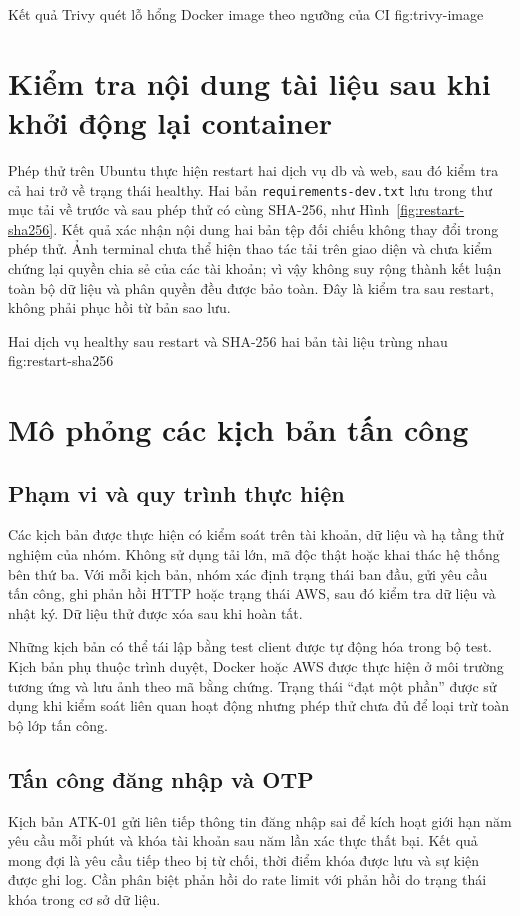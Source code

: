 {Kết quả Trivy quét lỗ hổng Docker image theo ngưỡng của CI}
{fig:trivy-image}

\section{Kiểm tra nội dung tài liệu sau khi khởi động lại container}
Phép thử trên Ubuntu thực hiện restart hai dịch vụ db và web, sau đó kiểm tra cả hai trở về trạng thái healthy. Hai bản \texttt{requirements-dev.txt} lưu trong thư mục tải về trước và sau phép thử có cùng SHA-256, như Hình~\ref{fig:restart-sha256}. Kết quả xác nhận nội dung hai bản tệp đối chiếu không thay đổi trong phép thử. Ảnh terminal chưa thể hiện thao tác tải trên giao diện và chưa kiểm chứng lại quyền chia sẻ của các tài khoản; vì vậy không suy rộng thành kết luận toàn bộ dữ liệu và phân quyền đều được bảo toàn. Đây là kiểm tra sau restart, không phải phục hồi từ bản sao lưu.

{Hai dịch vụ healthy sau restart và SHA-256 hai bản tài liệu trùng nhau}
{fig:restart-sha256}

\section{Mô phỏng các kịch bản tấn công}
\subsection{Phạm vi và quy trình thực hiện}
Các kịch bản được thực hiện có kiểm soát trên tài khoản, dữ liệu và hạ tầng thử nghiệm của nhóm. Không sử dụng tải lớn, mã độc thật hoặc khai thác hệ thống bên thứ ba. Với mỗi kịch bản, nhóm xác định trạng thái ban đầu, gửi yêu cầu tấn công, ghi phản hồi HTTP hoặc trạng thái AWS, sau đó kiểm tra dữ liệu và nhật ký. Dữ liệu thử được xóa sau khi hoàn tất.

Những kịch bản có thể tái lập bằng test client được tự động hóa trong bộ test. Kịch bản phụ thuộc trình duyệt, Docker hoặc AWS được thực hiện ở môi trường tương ứng và lưu ảnh theo mã bằng chứng. Trạng thái ``đạt một phần'' được sử dụng khi kiểm soát liên quan hoạt động nhưng phép thử chưa đủ để loại trừ toàn bộ lớp tấn công.

\subsection{Tấn công đăng nhập và OTP}
Kịch bản ATK-01 gửi liên tiếp thông tin đăng nhập sai để kích hoạt giới hạn năm yêu cầu mỗi phút và khóa tài khoản sau năm lần xác thực thất bại. Kết quả mong đợi là yêu cầu tiếp theo bị từ chối, thời điểm khóa được lưu và sự kiện được ghi log. Cần phân biệt phản hồi do rate limit với phản hồi do trạng thái khóa trong cơ sở dữ liệu.

